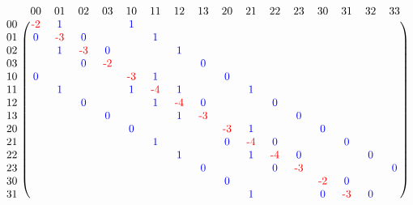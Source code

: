 \begin{figure*}
\centering
\[
	\begin{blockarray}{ccccccccccccccccc}
	& 00 & 01 & 02 & 03 & 10 & 11 & 12 & 13 & 20 & 21 & 22 & 23 & 30 & 31 & 32 & 33\\
	\begin{block}{c(cccccccccccccccc)}
		00 & \textcolor{red}{\text{-}2} & \textcolor{blue}{1} & & & \textcolor{blue}{1} & & & & & & & & & & &  \\
  		01 & \textcolor{blue}{0} & \textcolor{red}{\text{-}3} & \textcolor{blue}{0} & & & \textcolor{blue}{1} & & & & & & & & & & \\
	  	02 & & \textcolor{blue}{1} & \textcolor{red}{\text{-}3} & \textcolor{blue}{0} & & & \textcolor{blue}{1} & & & & & & & & & \\
  		03 & & & \textcolor{blue}{0} & \textcolor{red}{\text{-}2} & & & & \textcolor{blue}{0} & & & & & & & & \\
  		10 & \textcolor{blue}{0} & & & & \textcolor{red}{\text{-}3} & \textcolor{blue}{1} & & & \textcolor{blue}{0} & & & & & & & \\
  		11 & & \textcolor{blue}{1} & & & \textcolor{blue}{1} & \textcolor{red}{\text{-}4} & \textcolor{blue}{1} & & & \textcolor{blue}{1} & & & & & & \\
		12 & & & \textcolor{blue}{0} & & & \textcolor{blue}{1} & \textcolor{red}{\text{-}4} & \textcolor{blue}{0} & & & \textcolor{blue}{0} & & & & & \\
		13 & & & & \textcolor{blue}{0} & & & \textcolor{blue}{1} & \textcolor{red}{\text{-}3} & & & & \textcolor{blue}{0} & & & & \\
		20 & & & & & \textcolor{blue}{0} & & & & \textcolor{red}{\text{-}3} & \textcolor{blue}{1} & & & \textcolor{blue}{0} & & & \\
		21 & & & & & & \textcolor{blue}{1} & & & \textcolor{blue}{0} & \textcolor{red}{\text{-}4} & \textcolor{blue}{0} & & & \textcolor{blue}{0} & & \\
		22 & & & & & & & \textcolor{blue}{1} & & & \textcolor{blue}{1} & \textcolor{red}{\text{-}4} & \textcolor{blue}{0} & & & \textcolor{blue}{0} & \\
		23 & & & & & & & & \textcolor{blue}{0} & & & \textcolor{blue}{0} & \textcolor{red}{\text{-}3} & & & & \textcolor{blue}{0}  \\
		30 & & & & & & & & & \textcolor{blue}{0} & & & & \textcolor{red}{\text{-}2} & \textcolor{blue}{0} & & \\
		31 & & & & & & & & & & \textcolor{blue}{1} & & & \textcolor{blue}{0} & \textcolor{red}{\text{-}3} & \textcolor{blue}{0} & \\

\end{block}
\end{blockarray}\]
\end{figure*}
